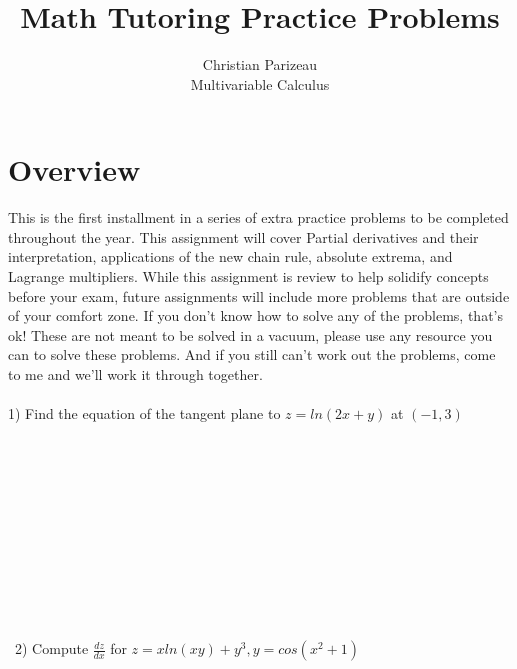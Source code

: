 \documentclass[12pt]{article}
\begin{document}
 
 
 
\title{Math Tutoring Practice Problems}%
\author{Christian Parizeau\\ %
Multivariable Calculus} %
 
\maketitle
\section{Overview}
This is the first installment in a series of extra practice problems to be completed throughout the year. This assignment will cover Partial derivatives and their interpretation, applications of the new chain rule, absolute extrema, and Lagrange multipliers. While this assignment is review to help solidify concepts before your exam, future assignments will include more problems that are outside of your comfort zone. If you don't know how to solve any of the problems, that's ok! These are not meant to be solved in a vacuum, please use any resource you can to solve these problems. And if you still can't work out the problems, come to me and we'll work it through together. \\\\
1) Find the equation of the tangent plane to $z = ln(2x+y)$ at $(-1,3)$
\\\\\\\\\\\\\\\\\\\\\\\\\
2) Compute $\frac{dz}{dx}$ for $z = xln(xy) + y^3, y=cos(x^2+1)$
\\\\\\\\\\\\\\\\\\
\end{document}
